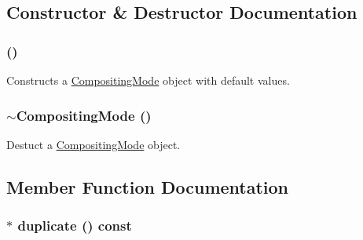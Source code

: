 \subsection{Constructor \& Destructor Documentation}
\hypertarget{classm3g_1_1CompositingMode_5abfd1a798f1327aac4b92f55d4ecc0c}{
\subsubsection[{CompositingMode}]{ ()}}
\label{classm3g_1_1CompositingMode_5abfd1a798f1327aac4b92f55d4ecc0c}


Constructs a \hyperlink{classm3g_1_1CompositingMode}{CompositingMode} object with default values. \hypertarget{classm3g_1_1CompositingMode_0bba5b15be7249e946c9aaf94631ce3b}{
\subsubsection[{$\sim$CompositingMode}]{\setlength{\rightskip}{0pt plus 5cm}$\sim${\bf CompositingMode} ()}}
\label{classm3g_1_1CompositingMode_0bba5b15be7249e946c9aaf94631ce3b}


Destuct a \hyperlink{classm3g_1_1CompositingMode}{CompositingMode} object. 

\subsection{Member Function Documentation}
\hypertarget{classm3g_1_1CompositingMode_ab6fcd945b68728bbe2c65a8f45dc8dd}{
\subsubsection[{duplicate}]{ $\ast$ duplicate () const}}
\label{classm3g_1_1CompositingMode_ab6fcd945b68728bbe2c65a8f45dc8dd}


